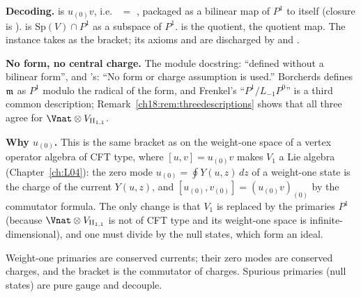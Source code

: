\begin{dictionary}
\textbf{Decoding.}   is $u_{(0)}v$, i.e.\  $=$
, packaged as a bilinear map of $P^1$ to itself (closure is
).   is $\mathrm{Sp}(V)\cap P^1$ as a subspace of $P^1$.
 is the quotient,  the quotient map.  The  instance takes
 as the bracket; its axioms  and  are discharged by
 and .

\textbf{No form, no central charge.}  The module docstring: ``defined without a bilinear form'', and
's: ``No form or charge assumption is used.''  Borcherds defines $\mathfrak{m}$ as $P^1$ modulo the
radical of the form, and Frenkel's ``$P^1/L_{-1}P^0$'' is a third common description; Remark~\ref{ch18:rem:threedescriptions}
shows that all three agree for $\Vnat\otimes V_{\chXVIIIII}$.

\textbf{Why $u_{(0)}$.}  This is the same bracket as on the weight-one space of a vertex operator algebra of CFT type, where
$[u,v]=u_{(0)}v$ makes $V_1$ a Lie algebra (Chapter~\ref{ch:L04}): the zero mode $u_{(0)}=\oint Y(u,z)\,dz$ of a weight-one
state is the charge of the current $Y(u,z)$, and $[u_{(0)},v_{(0)}]=(u_{(0)}v)_{(0)}$ by the commutator formula.  The only change
is that $V_1$ is replaced by the primaries $P^1$ (because $\Vnat\otimes V_{\chXVIIIII}$ is not of CFT type and its weight-one space is
infinite-dimensional), and one must divide by the null states, which form an ideal.
\end{dictionary}
\begin{physics}
Weight-one primaries are conserved currents; their zero modes are conserved charges, and the bracket is
the commutator of charges.  Spurious primaries (null states) are pure gauge and decouple.
\end{physics}

